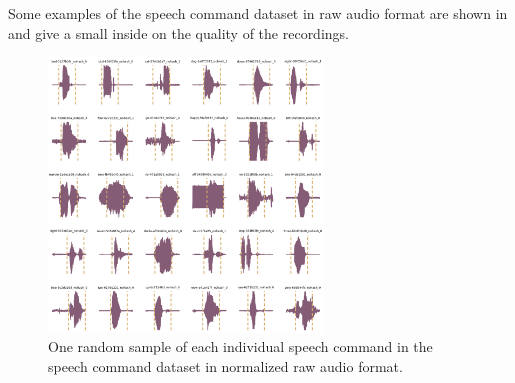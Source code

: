 Some examples of the speech command dataset in raw audio format are shown in  and give a small inside on the quality of the recordings.
\begin{figure}[!ht]
  \centering
    \includegraphics[width=0.65\textwidth]{./5_exp/figs/exp_dataset_wav_grid_c30}
  \caption{One random sample of each individual speech command in the speech command dataset in normalized raw audio format.}
  \label{fig:exp_dataset_wav_grid_c30}
\end{figure}
\FloatBarrier
\noindent


